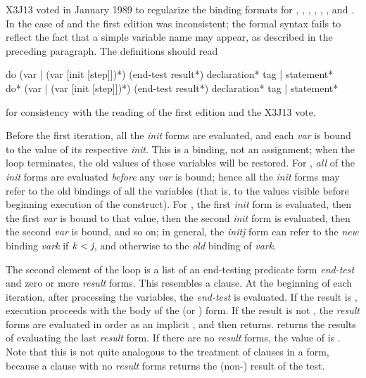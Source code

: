 \begin{defmac}
\begin{new}
X3J13 voted in January 1989
to regularize the binding formats for , , ,
, , , and .
In the case of  and  the first edition was inconsistent;
the formal syntax fails to reflect the fact that a simple variable
name may appear, as described in the preceding paragraph.  The
definitions should read

\begin{defmac}
do ({var | (var [init [step]])}*)
   (end-test {result}*)
   {declaration}* {tag | statement}* \\
do* ({var | (var [init [step]])}*)
    (end-test {result}*)
    {declaration}* {tag | statement}*

for consistency with the reading of the first edition and the X3J13 vote.
\end{defmac}
\end{new}

Before the first iteration, all the \textit{init} forms are evaluated, and
each \textit{var} is bound to the value of its respective \textit{init}.
This is a binding, not an assignment; when the loop terminates,
the old values of those variables will be restored.
For , \textit{all} of the \textit{init} forms are evaluated \textit{before} any \textit{var}
is bound; hence all the
\textit{init} forms may refer to the old bindings of all the variables
(that is, to the values visible before beginning execution of
the  construct).
For , the first \textit{init} form is evaluated, then the first
\textit{var} is bound to that value, then the second \textit{init} form
is evaluated, then the second \textit{var} is bound, and so on;
in general, the \textit{initj} form can refer to the \textit{new} binding \textit{vark}
if $\textit{k\/}<\textit{j}$, and otherwise to the \textit{old} binding of \textit{vark}.

The second element of the loop is a list of an end-testing
predicate form \textit{end-test} and zero or more \textit{result} forms.
This resembles a  clause.
At the beginning of each iteration, after processing the variables,
the \textit{end-test} is evaluated.  If the result is
{\false}, execution proceeds with the body of the  (or ) form.
If the
result is not {\false}, the \textit{result} forms are evaluated in order
as an implicit ,
and then  returns.   returns the results of evaluating
the last \textit{result} form.
If there are no \textit{result} forms, the value of  is {\false}.
Note that this is not quite analogous to the treatment of
clauses in a  form, because a  clause
with no \textit{result} forms returns the (non-{\nil}) result of the test.


\end{defmac}
